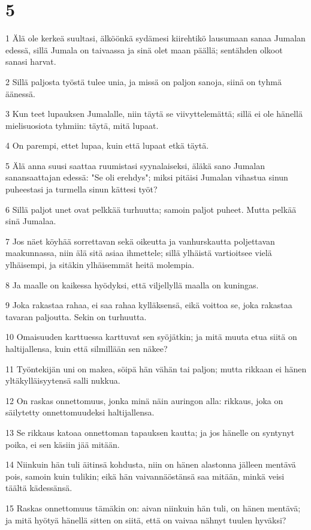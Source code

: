 \chapter{5}

\par 1 Älä ole kerkeä suultasi, älköönkä sydämesi kiirehtikö lausumaan sanaa Jumalan edessä, sillä Jumala on taivaassa ja sinä olet maan päällä; sentähden olkoot sanasi harvat.
\par 2 Sillä paljosta työstä tulee unia, ja missä on paljon sanoja, siinä on tyhmä äänessä.
\par 3 Kun teet lupauksen Jumalalle, niin täytä se viivyttelemättä; sillä ei ole hänellä mielisuosiota tyhmiin: täytä, mitä lupaat.
\par 4 On parempi, ettet lupaa, kuin että lupaat etkä täytä.
\par 5 Älä anna suusi saattaa ruumistasi syynalaiseksi, äläkä sano Jumalan sanansaattajan edessä: "Se oli erehdys"; miksi pitäisi Jumalan vihastua sinun puheestasi ja turmella sinun kättesi työt?
\par 6 Sillä paljot unet ovat pelkkää turhuutta; samoin paljot puheet. Mutta pelkää sinä Jumalaa.
\par 7 Jos näet köyhää sorrettavan sekä oikeutta ja vanhurskautta poljettavan maakunnassa, niin älä sitä asiaa ihmettele; sillä ylhäistä vartioitsee vielä ylhäisempi, ja sitäkin ylhäisemmät heitä molempia.
\par 8 Ja maalle on kaikessa hyödyksi, että viljellyllä maalla on kuningas.
\par 9 Joka rakastaa rahaa, ei saa rahaa kylläksensä, eikä voittoa se, joka rakastaa tavaran paljoutta. Sekin on turhuutta.
\par 10 Omaisuuden karttuessa karttuvat sen syöjätkin; ja mitä muuta etua siitä on haltijallensa, kuin että silmillään sen näkee?
\par 11 Työntekijän uni on makea, söipä hän vähän tai paljon; mutta rikkaan ei hänen yltäkylläisyytensä salli nukkua.
\par 12 On raskas onnettomuus, jonka minä näin auringon alla: rikkaus, joka on säilytetty onnettomuudeksi haltijallensa.
\par 13 Se rikkaus katoaa onnettoman tapauksen kautta; ja jos hänelle on syntynyt poika, ei sen käsiin jää mitään.
\par 14 Niinkuin hän tuli äitinsä kohdusta, niin on hänen alastonna jälleen mentävä pois, samoin kuin tulikin; eikä hän vaivannäöstänsä saa mitään, minkä veisi täältä kädessänsä.
\par 15 Raskas onnettomuus tämäkin on: aivan niinkuin hän tuli, on hänen mentävä; ja mitä hyötyä hänellä sitten on siitä, että on vaivaa nähnyt tuulen hyväksi?
